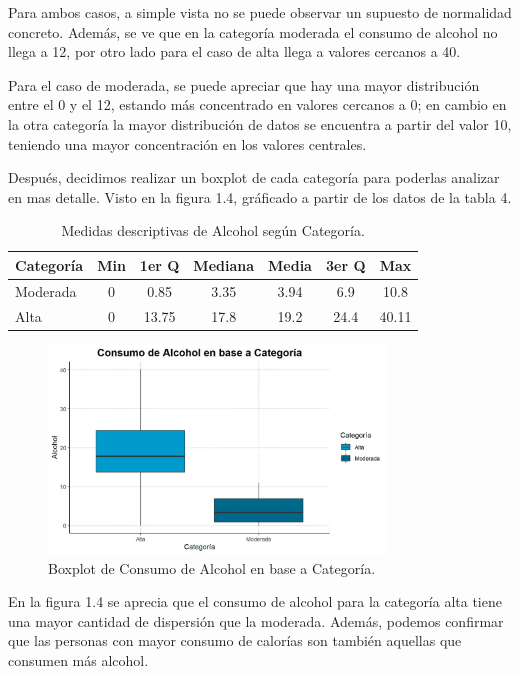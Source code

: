 \documentclass{article} %
\begin{document}
Para ambos casos, a simple vista no se puede observar un supuesto de normalidad concreto. Además, se ve que en la categoría moderada el consumo de alcohol no llega a 12, por otro lado para el caso de alta llega a valores cercanos a 40.

Para el caso de moderada, se puede apreciar que hay una mayor distribución entre el 0 y el 12, estando más concentrado en valores cercanos a 0; en cambio en la otra categoría la mayor distribución de datos se encuentra a partir del valor 10, teniendo una mayor concentración en los valores centrales.

Después, decidimos realizar un boxplot de cada categoría para poderlas analizar en mas detalle. Visto en la figura 1.4, gráficado a partir de los datos de la tabla 4.

\begin{table}[H]
	\centering
		\begin{tabular}{||l || c | c | c | c | c | c ||}
			\hline
			\hline
			Categoría & Min & 1er Q & Mediana & Media & 3er Q  & Max\\
			\hline			
			\hline
			Moderada & 0 & 0.85 & 3.35 & 3.94 & 6.9 & 10.8\\
			\hline
			Alta & 0 & 13.75 & 17.8 & 19.2 & 24.4 & 40.11\\
			\hline
			\hline
		\end{tabular}
		\caption{Medidas descriptivas de Alcohol según Categoría.}
	\label{tab:table2-punto-1-4}
\end{table}

\begin{figure}[H]
	\centering
	\includegraphics[width=0.8\textwidth]{images/1-4 box}
	\caption{Boxplot de Consumo de Alcohol en base a Categoría.}
	\label{fig:box2}
\end{figure}

En la figura 1.4 se aprecia que el consumo de alcohol para la categoría alta tiene una mayor cantidad de dispersión que la moderada. Además, podemos confirmar que las personas con mayor consumo de calorías son también aquellas que consumen más alcohol. 
\end{document}
